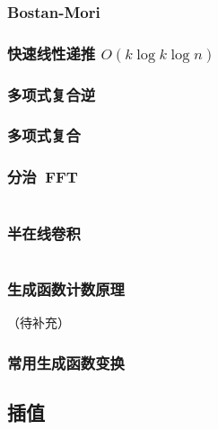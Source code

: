 \documentclass[a4paper, twoside]{article}
\begin{document}
\begin{multicols}{2}

				\subsubsection[Bostan-Mori（求多项式分式第 n 项）]{Bostan-Mori}
					\label{BostanMori}
					
				
				\subsubsection{快速线性递推 $O(k\log k\log n)$}
					\label{LinearRecurrence}
					

				\subsubsection{多项式复合逆}
					\label{PolyCompositeInverse}
					
				
				\subsubsection{多项式复合}
					

				\subsubsection{分治~FFT}
					\inputminted{cpp}{../src/math/分治FFT.cpp}

				\subsubsection{半在线卷积}
					\inputminted{cpp}{../src/math/半在线卷积.cpp}
			
				\subsubsection{生成函数计数原理}
					（待补充）
				
				\subsubsection{常用生成函数变换}
					

			\subsection{插值}

\end{multicols}
\end{document}
